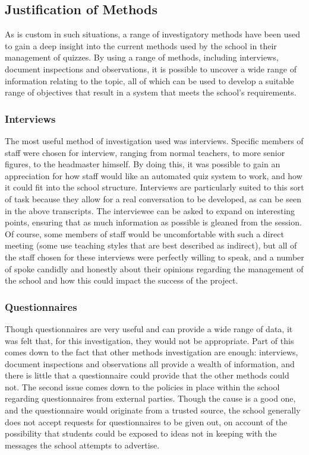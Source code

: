 \subsection{Justification of Methods} %
\label{sub:justification_of_methods}
As is custom in such situations, a range of investigatory methods have been used to gain a deep insight into the current methods used by the school in their management of quizzes. By using a range of methods, including interviews, document inspections and observations, it is possible to uncover a wide range of information relating to the topic, all of which can be used to develop a suitable range of objectives that result in a system that meets the school's requirements.

\subsubsection{Interviews} %
\label{ssub:interviews}
The most useful method of investigation used was interviews. Specific members of staff were chosen for interview, ranging from normal teachers, to more senior figures, to the headmaster himself. By doing this, it was possible to gain an appreciation for how staff would like an automated quiz system to work, and how it could fit into the school structure. Interviews are particularly suited to this sort of task because they allow for a real conversation to be developed, as can be seen in the above transcripts. The interviewee can be asked to expand on interesting points, ensuring that as much information as possible is gleaned from the session. Of course, some members of staff would be uncomfortable with such a direct meeting (some use teaching styles that are best described as indirect), but all of the staff chosen for these interviews were perfectly willing to speak, and a number of spoke candidly and honestly about their opinions regarding the management of the school and how this could impact the success of the project.

\subsubsection{Questionnaires} %
\label{ssub:questionnaires}
Though questionnaires are very useful and can provide a wide range of data, it was felt that, for this investigation, they would not be appropriate. Part of this comes down to the fact that other methods investigation are enough: interviews, document inspections and observations all provide a wealth of information, and there is little that a questionnaire could provide that the other methods could not. The second issue comes down to the policies in place within the school regarding questionnaires from external parties. Though the cause is a good one, and the questionnaire would originate from a trusted source, the school generally does not accept requests for questionnaires to be given out, on account of the possibility that students could be exposed to ideas not in keeping with the messages the school attempts to advertise.
